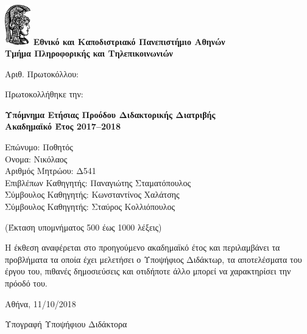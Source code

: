 \documentclass[a4paper]{article}
\begin{document}

\includegraphics[width=3em]{athena}
\textbf{Εθνικό και Καποδιστριακό Πανεπιστήμιο Αθηνών \\
        Τμήμα Πληροφορικής και Τηλεπικοινωνιών}

\vspace{1em}

\noindent
Αριθ. Πρωτοκόλλου:

\noindent
Πρωτοκολλήθηκε την:

\begin{center}
  \textbf{Υπόμνημα Ετήσιας Προόδου Διδακτορικής Διατριβής \\
          Ακαδημαϊκό Έτος 2017–2018}
\end{center}

\noindent
Επώνυμο: Ποθητός \\
Ονομα: Νικόλαος \\
Αριθμός Μητρώου: Δ541 \\
Επιβλέπων Καθηγητής: Παναγιώτης Σταματόπουλος \\
Σύμβουλος Καθηγητής: Κωνσταντίνος Χαλάτσης \\
Σύμβουλος Καθηγητής: Σταύρος Κολλιόπουλος

\begin{center}
  (Έκταση υπομνήματος 500 έως 1000 λέξεις)
\end{center}

Η έκθεση αναφέρεται στο προηγούμενο ακαδημαϊκό έτος και
περιλαμβάνει τα προβλήματα τα οποία έχει μελετήσει ο
Υποψήφιος Διδάκτωρ, τα αποτελέσματα του έργου του, πιθανές
δημοσιεύσεις και οτιδήποτε άλλο μπορεί να χαρακτηρίσει την
πρόοδό του.

\begin{center}
  Αθήνα, 11/10/2018

  \vspace{4em}

  Υπογραφή Υποψήφιου Διδάκτορα
\end{center}
\end{document}
